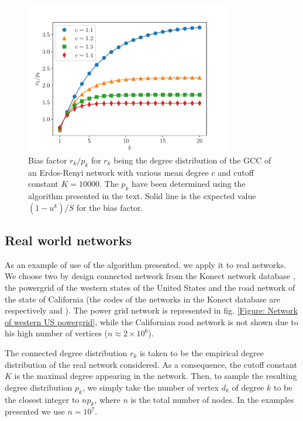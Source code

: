 \documentclass[
11pt, %
english, %
singlespacing, %
nolistspacing, %
liststotoc, %
headsepline, %
]{MastersDoctoralThesis} %
\begin{document}
\begin{figure}
	\includegraphics[width=0.8\textwidth]{ER_reconstruction.pdf}
	\caption{Bias factor $r_k/p_k$ for $r_k$ being the degree distribution of the GCC of an Erdos-Renyi network with various mean degree $c$ and cutoff constant $K = 10000$. The $p_k$ have been determined using the algorithm presented in the text. Solid line is the expected value $(1 - u^k)/S$ for the bias factor.}
	\label{Figure: Erdos-Renyi reconstruction}
\end{figure}

\subsection{Real world networks}

As an example of use of the algorithm presented, we apply it to real networks. We choose two by design connected network from the Konect network database \cite{kunegis2013konect}, the powergrid of the western states of the United States \cite{watts1998collective} and the road network of the state of California \cite{leskovec2008community} (the codes of the networks in the Konect database are respectively  and ). The power grid network is represented in fig. \ref{Figure: Network of western US powergrid}, while the Californian road network is not shown due to his high number of vertices ($n \approx 2 \times 10^6$).

The connected degree distribution $r_k$ is taken to be the empirical degree distribution of the real network considered. As a consequence, the cutoff constant $K$ is the maximal degree appearing in the network. Then, to sample the resulting degree distribution $p_k$, we simply take the number of vertex $d_k$ of degree $k$ to be the closest integer to $n p_k$, where $n$ is the total number of nodes. In the examples presented we use $n = 10^7$.
\end{document}
